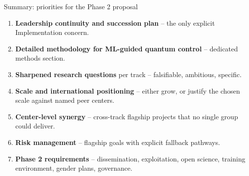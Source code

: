 \documentclass[10pt,aspectratio=169]{beamer}
\begin{document}
\begin{frame}{Summary: priorities for the Phase 2 proposal}
  \begin{enumerate}
    \item \textbf{Leadership continuity and succession plan} -- the only explicit Implementation concern.
    \item \textbf{Detailed methodology for ML-guided quantum control} -- dedicated methods section.
    \item \textbf{Sharpened research questions} per track -- falsifiable, ambitious, specific.
    \item \textbf{Scale and international positioning} -- either grow, or justify the chosen scale against named peer centers.
    \item \textbf{Center-level synergy} -- cross-track flagship projects that no single group could deliver.
    \item \textbf{Risk management} -- flagship goals with explicit fallback pathways.
    \item \textbf{Phase 2 requirements} -- dissemination, exploitation, open science, training environment, gender plans, governance.
  \end{enumerate}
\end{frame}
\end{document}
